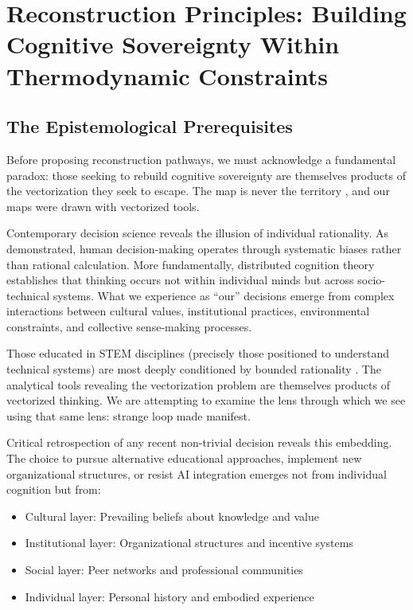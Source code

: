 \section{Reconstruction Principles: Building Cognitive Sovereignty Within Thermodynamic Constraints}

\subsection{The Epistemological Prerequisites}

Before proposing reconstruction pathways, we must acknowledge a fundamental paradox: those seeking to rebuild cognitive sovereignty are themselves products of the vectorization they seek to escape. The map is never the territory \citep{korzybski1933}, and our maps were drawn with vectorized tools.

Contemporary decision science reveals the illusion of individual rationality. As \citet{kahneman2011} demonstrated, human decision-making operates through systematic biases rather than rational calculation. More fundamentally, distributed cognition theory \citep{hutchins1995} establishes that thinking occurs not within individual minds but across socio-technical systems. What we experience as ``our'' decisions emerge from complex interactions between cultural values, institutional practices, environmental constraints, and collective sense-making processes.

Those educated in STEM disciplines (precisely those positioned to understand technical systems) are most deeply conditioned by bounded rationality \citep{simon1991}. The analytical tools revealing the vectorization problem are themselves products of vectorized thinking. We are attempting to examine the lens through which we see using that same lens: \citet{hofstadter1979} strange loop made manifest.

Critical retrospection of any recent non-trivial decision reveals this embedding. The choice to pursue alternative educational approaches, implement new organizational structures, or resist AI integration emerges not from individual cognition but from:
\begin{itemize}
\item Cultural layer: Prevailing beliefs about knowledge and value \citep{schein1985}
\item Institutional layer: Organizational structures and incentive systems \citep{dimaggio1983}
\item Social layer: Peer networks and professional communities \citep{granovetter1985}
\item Individual layer: Personal history and embodied experience \citep{bourdieu1990}
\end{itemize}

